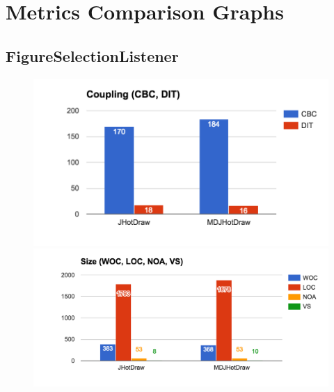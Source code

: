 \section{Metrics Comparison Graphs}\label{Metrics Comparison Graphs}

\subsection{FigureSelectionListener}

\begin{figure}[H]
	\includegraphics[scale=0.5]{figures/metrics/Metric_Observer_Coupling.png}
	\includegraphics[scale=0.45]{figures/metrics/Metric_Observer_Size.png}


\end{figure}
